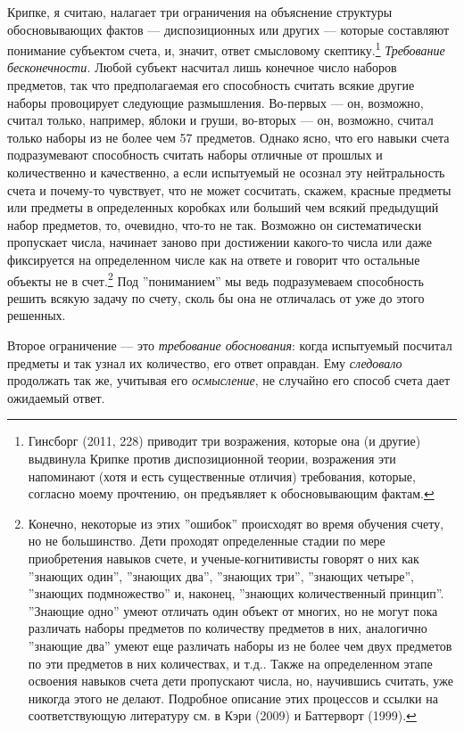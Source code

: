 \documentclass[12pt]{book}
\begin{document}
Крипке, я считаю, налагает три ограничения на объяснение структуры обосновывающих фактов --- диспозиционных или других --- которые составляют понимание субъектом счета, и, значит, ответ смысловому скептику.\footnote{Гинсборг (2011, 228) приводит три возражения, которые она (и другие) выдвинула Крипке против диспозиционной теории, возражения эти напоминают (хотя и есть существенные отличия) требования, которые, согласно моему прочтению, он предъявляет к обосновывающим фактам.} \textit{Требование бесконечности.} Любой субъект насчитал лишь конечное число наборов предметов, так что предполагаемая его способность считать всякие другие наборы провоцирует следующие размышления. Во-первых --- он, возможно, считал только, например, яблоки и груши, во-вторых --- он, возможно, считал только наборы из не более чем 57 предметов. Однако ясно, что его навыки счета подразумевают способность считать наборы отличные от прошлых и количественно и качественно, а если испытуемый не осознал эту нейтральность счета и почему-то чувствует, что не может сосчитать, скажем, красные предметы или предметы в определенных коробках или больший чем всякий предыдущий набор предметов, то, очевидно, что-то не так. Возможно он систематически пропускает числа, начинает заново при достижении какого-то числа или даже фиксируется на определенном числе как на ответе и говорит что остальные объекты не в счет.\footnote{Конечно, некоторые из этих ''ошибок'' происходят во время обучения счету, но не большинство. Дети проходят определенные стадии по мере приобретения навыков счете, и ученые-когнитивисты говорят о них как ''знающих один'', ''знающих два'', ''знающих три'', ''знающих четыре'', ''знающих подмножество'' и, наконец, ''знающих количественный принцип''. ''Знающие одно'' умеют отличать один объект от многих, но не могут пока различать наборы предметов по количеству предметов в них, аналогично ''знающие два'' умеют еще различать наборы из не более чем двух предметов по эти предметов в них количествах, и т.д.. Также на определенном этапе освоения навыков счета дети пропускают числа, но, научившись считать, уже никогда этого не делают. Подробное описание этих процессов и ссылки на соответствующую литературу см. в Кэри (2009) и Баттерворт (1999).} Под ''пониманием'' мы ведь подразумеваем способность решить всякую задачу по счету, сколь бы она не отличалась от уже до этого решенных.

Второе ограничение --- это \textit{требование обоснования}: когда испытуемый посчитал предметы и так узнал их количество, его ответ оправдан. Ему \textit{следовало} продолжать так же, учитывая его \textit{осмысление}, не случайно его способ счета дает ожидаемый ответ.
\end{document}
